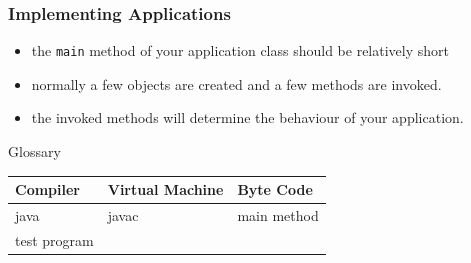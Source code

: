 \begin{frame}[fragile]
\frametitle{Implementing Applications}
\begin{itemize}
\item the \lstinline!main! method of your application class should be relatively short
\item normally a few objects are created and a few methods are invoked. 
\item the invoked methods will determine the behaviour of your application.
\end{itemize}
\end{frame}


\begin{frame}{Glossary}
\begin{tabular}{|l|l|l|}
\hline
Compiler & Virtual Machine & Byte Code\\
\hline
java & javac & main method \\
\hline
test program & & \\
\hline
\end{tabular}
\end{frame}


